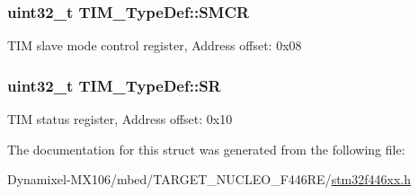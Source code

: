 \subsubsection[{\texorpdfstring{S\+M\+CR}{SMCR}}]{ uint32\+\_\+t T\+I\+M\+\_\+\+Type\+Def\+::\+S\+M\+CR}\hypertarget{struct_t_i_m___type_def_a67d30593bcb68b98186ebe5bc8dc34b1}{}\label{struct_t_i_m___type_def_a67d30593bcb68b98186ebe5bc8dc34b1}
T\+IM slave mode control register, Address offset\+: 0x08 
\subsubsection[{\texorpdfstring{SR}{SR}}]{ uint32\+\_\+t T\+I\+M\+\_\+\+Type\+Def\+::\+SR}\hypertarget{struct_t_i_m___type_def_acedfc978c879835c05ef1788ad26b2ff}{}\label{struct_t_i_m___type_def_acedfc978c879835c05ef1788ad26b2ff}
T\+IM status register, Address offset\+: 0x10 

The documentation for this struct was generated from the following file\+:\begin{DoxyCompactItemize}
\item 
Dynamixel-\/\+M\+X106/mbed/\+T\+A\+R\+G\+E\+T\+\_\+\+N\+U\+C\+L\+E\+O\+\_\+\+F446\+R\+E/\hyperlink{stm32f446xx_8h}{stm32f446xx.\+h}\end{DoxyCompactItemize}
